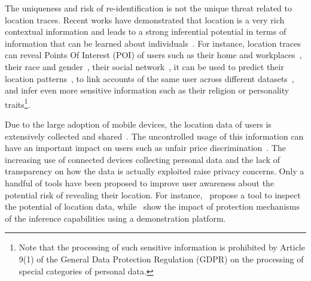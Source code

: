 The uniqueness and risk of re-identification is not the unique threat related to location traces.
Recent works have demonstrated that location is a very rich contextual information and leads to a strong inferential potential in terms of information that can be learned about individuals~\cite{boutet:hal-02421828}. 
For instance, location traces can reveal Points Of Interest (POI) of users such as their home and workplaces~\cite{10.1145/1868470.1868479}, their race and gender~\cite{10.1145/2684822.2685287}, their social network~\cite{10.1145/2665943.2665960}, it can be used to predict their location patterns~\cite{sadilek2012far}, to link accounts of the same user across different datasets~\cite{10.1145/2872427.2883002}, and infer even more sensitive information such as their religion or personality traits\footnote{Note that the processing of such sensitive information is prohibited by Article 9(1) of the General Data Protection Regulation (GDPR) on the processing of special categories of personal data.}.

Due to the large adoption of mobile devices, the location data of users is extensively collected and shared~\cite{almuhimedi2015your,10.1145/2976749.2978313}.
The uncontrolled usage of this information can have an important impact on users such as unfair price discrimination~\cite{10.1145/2390231.2390245}.
The increasing use of connected devices collecting personal data and the lack of transparency on how the data is actually exploited raise privacy concerns.
Only a handful of tools have been proposed to improve user awareness about the potential risk of revealing their location.
For instance,~\cite{Riederer2016FindYouAP} propose a tool to inspect the potential of location data, while~\cite{boutet:hal-02421828} show the impact of protection mechanisms of the inference capabilities using a demonstration platform.

